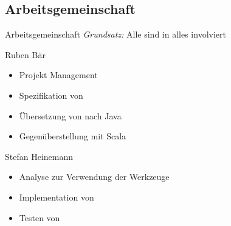 \subsection{Arbeitsgemeinschaft}
\begin{frame}[t]{Arbeitsgemeinschaft}
	\emph{Grundsatz:} Alle sind in alles involviert
	\begin{bigitemize}[<+->]{3mm}
		\item<1-> Ruben Bär
		\begin{itemize}
			\item<2-> Projekt Management
			\item<2-> Spezifikation von \ooplss
			\item<2-> Übersetzung von \ooplss nach Java
			\item<2-> Gegenüberstellung mit Scala
		\end{itemize}

		\item<1-> Stefan Heinemann
		\begin{itemize}
			\item<3-> Analyse zur Verwendung der Werkzeuge
			\item<3-> Implementation von \ooplss
			\item<3-> Testen von \ooplss
		\end{itemize}
	\end{bigitemize}
\end{frame}
